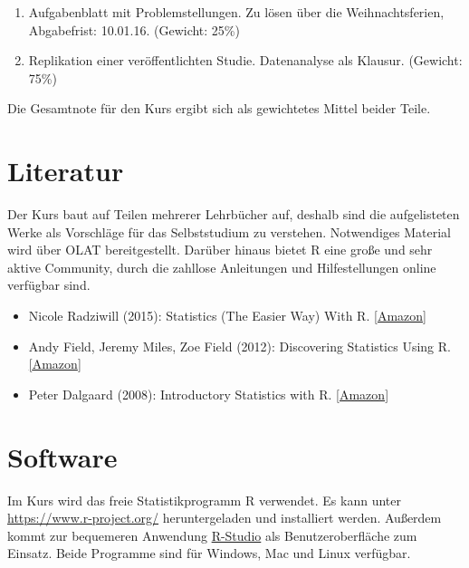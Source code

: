 \documentclass[]{article}
\renewcommand{\[}{\begin{equation}}
\renewcommand{\]}{\end{equation}}
\newcommand{\R}{\textsf{R}}
\begin{document}
\begin{enumerate}
\def\labelenumi{\arabic{enumi}.}
\itemsep1pt\parskip0pt
\item
  Aufgabenblatt mit Problemstellungen. Zu lösen über die
  Weihnachtsferien, Abgabefrist: 10.01.16. (Gewicht: 25\%)
\item
  Replikation einer veröffentlichten Studie. Datenanalyse als Klausur.
  (Gewicht: 75\%)
\end{enumerate}

Die Gesamtnote für den Kurs ergibt sich als gewichtetes Mittel beider
Teile.

\section{Literatur}\label{literatur}

Der Kurs baut auf Teilen mehrerer Lehrbücher auf, deshalb sind die
aufgelisteten Werke als Vorschläge für das Selbststudium zu verstehen.
Notwendiges Material wird über OLAT bereitgestellt. Darüber hinaus
bietet \R{} eine große und sehr aktive Community, durch die zahllose
Anleitungen und Hilfestellungen online verfügbar sind.

\begin{itemize}
\item
  Nicole Radziwill (2015): Statistics (The Easier Way) With R.
  \href{http://www.amazon.de/Statistics-Easier-Way-informal-statistics/dp/0692339426/}{{[}Amazon{]}}
\item
  Andy Field, Jeremy Miles, Zoe Field (2012): Discovering Statistics
  Using R.
  \href{http://www.amazon.de/gp/product/1446200469/}{{[}Amazon{]}}
\item
  Peter Dalgaard (2008): Introductory Statistics with R.
  \href{http://www.amazon.de/Introductory-Statistics-R-Computing/dp/0387790535/}{{[}Amazon{]}}
\end{itemize}

\section{Software}\label{software}

Im Kurs wird das freie Statistikprogramm \R{} verwendet. Es kann unter
\href{https://www.r-project.org/}{\url{https://www.r-project.org/}}
heruntergeladen und installiert werden. Außerdem kommt zur bequemeren
Anwendung
\href{https://www.rstudio.com/products/rstudio/download/}{R-Studio} als
Benutzeroberfläche zum Einsatz. Beide Programme sind für Windows, Mac
und Linux verfügbar.
\end{document}

